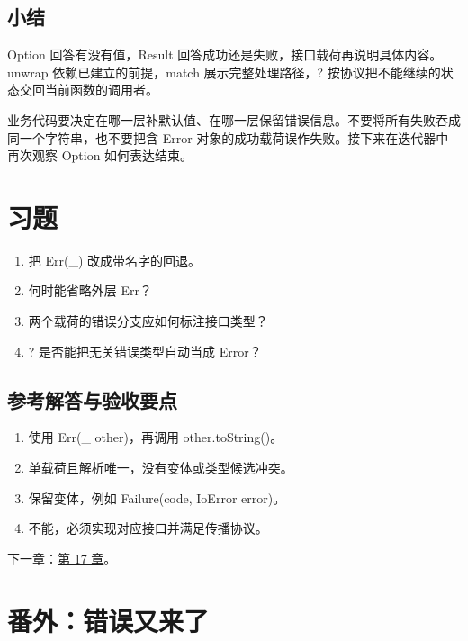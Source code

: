 \subsection*{小结}

Option 回答有没有值，Result 回答成功还是失败，接口载荷再说明具体内容。unwrap 依赖已建立的前提，match 展示完整处理路径，? 按协议把不能继续的状态交回当前函数的调用者。

业务代码要决定在哪一层补默认值、在哪一层保留错误信息。不要将所有失败吞成同一个字符串，也不要把含 Error 对象的成功载荷误作失败。接下来在迭代器中再次观察 Option 如何表达结束。

\section{习题}

\begin{enumerate}

\item 把 Err(\_) 改成带名字的回退。

\item 何时能省略外层 Err？

\item 两个载荷的错误分支应如何标注接口类型？

\item ? 是否能把无关错误类型自动当成 Error？

\end{enumerate}

\subsection*{参考解答与验收要点}

\begin{enumerate}

\item 使用 Err(\_ other)，再调用 other.toString()。

\item 单载荷且解析唯一，没有变体或类型候选冲突。

\item 保留变体，例如 Failure(code, IoError error)。

\item 不能，必须实现对应接口并满足传播协议。

\end{enumerate}

下一章：\hyperref[ch:17]{第 17 章}。

\section{番外：错误又来了}

